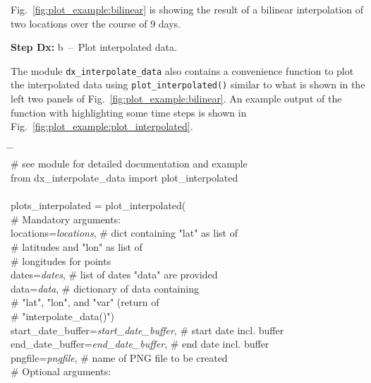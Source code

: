 \documentclass[10pt,a4paper,titlepage,parskip]{scrartcl}
\newenvironment{ttfont}{\fontfamily{\ttdefault}\selectfont}{\par}
\newcommand{\GRAU}[1]{\textcolor{ufzgray2}{#1}}
\begin{document}
Fig.~\ref{fig:plot_example:bilinear} is showing the result of a bilinear interpolation of two locations over the course of 9 days.
\pagebreak 

\textbf{Step Dx:} b~--~Plot interpolated data.

The module \texttt{dx\_interpolate\_data} also contains a convenience function to plot the interpolated data using \texttt{plot\_interpolated()} similar to what is shown in the left two panels of Fig.~\ref{fig:plot_example:bilinear}. An example output of the function with highlighting some time steps is shown in Fig.~\ref{fig:plot_example:plot_interpolated}.

\begin{framed}
	\vspace*{-1.2cm}
	\begin{ttfont}
		\begin{tabbing}
			\hspace{1.0cm} \= \hspace{7.2cm} \= \kill \\[4pt]
			\GRAU{\# see module for detailed documentation and example}\\
			from dx\_interpolate\_data import plot\_interpolated\\
			\\
			plots\_interpolated = plot\_interpolated(\\
			\> \GRAU{\# Mandatory arguments:}\\
			\> locations=\textit{locations}, \> \GRAU{\# dict containing "lat" as list of }\\
			\> \> \GRAU{\# latitudes and "lon" as list of }\\
			\> \> \GRAU{\# longitudes for points }\\
			\> dates=\textit{dates}, \> \GRAU{\# list of dates "data" are provided}\\
			\> data=\textit{data}, \> \GRAU{\# dictionary of data containing }\\
			\> \> \GRAU{\# "lat", "lon", and "var" (return of }\\
			\> \> \GRAU{\# "interpolate\_data()")}\\
			\> start\_date\_buffer=\textit{start\_date\_buffer}, \> \GRAU{\# start date incl. buffer}\\
			\> end\_date\_buffer=\textit{end\_date\_buffer}, \> \GRAU{\# end date incl. buffer}\\
			\> pngfile=\textit{pngfile}, \> \GRAU{\# name of PNG file to be created}\\
			\> \GRAU{\# Optional arguments:}\\

\end{tabbing}
\end{ttfont}
\end{framed}
\end{document}
